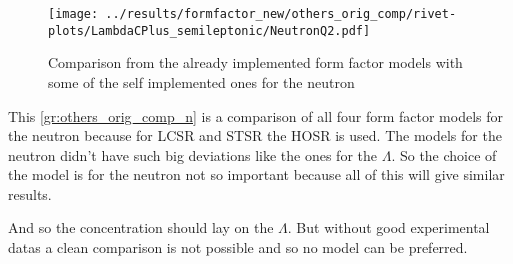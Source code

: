 \begin{figure}[h]
  \centering
  \texttt{[image: ../results/formfactor\_new/others\_orig\_comp/rivet-plots/LambdaCPlus\_semileptonic/NeutronQ2.pdf]}
  \caption{Comparison from the already implemented form factor models with 
  some of the self implemented ones for the neutron} \label{gr:others_orig_comp_n}
\end{figure}
This {\eqref{gr:others_orig_comp_n}} is a comparison of all four form factor 
models for the neutron because for LCSR and STSR the HOSR is used. The models for 
the neutron didn't have such big deviations like the ones for the \(\Lambda\). 
So the choice of the model is for the neutron not so important because all of this 
will give similar results.
\par
And so the concentration should lay on the \(\Lambda\). But without good 
experimental datas a clean comparison is not possible and so no model can 
be preferred.

